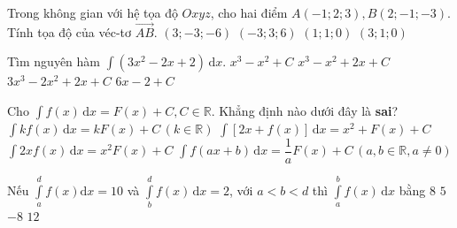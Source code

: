 	\begin{ex}%
		Trong không gian với hệ tọa độ $Oxyz$, cho hai điểm $A(-1;2;3), B(2;-1;-3)$. Tính tọa độ của véc-tơ $\overrightarrow{AB}$.		
		\choice
		{$(3;-3;-6)$}
		{$(-3;3;6)$}
		{$(1;1;0)$}
		{$(3;1;0)$}
	\end{ex}
	\begin{ex}%
		Tìm nguyên hàm  $\displaystyle\int (3x^2-2x+2)\mathrm{\,d}x$.
		\choice
		{$x^3-x^2+C$}
		{\True $x^3-x^2+2x+C$}
		{$3x^3-2x^2+2x+C$}
		{$6x-2+C$}
	\end{ex}
	\begin{ex}%
		Cho $\displaystyle\int f(x)\mathrm{\,d}x=F(x)+C, C\in \mathbb{R}$. Khẳng định nào dưới đây là \textbf{sai}?		
		\choice
		{$\displaystyle\int kf(x)\mathrm{\,d}x=kF(x)+C\, (k \in \mathbb{R})$}
		{$\displaystyle\int [2x+f(x)]\mathrm{\,d}x=x^2+F(x)+C$}
		{\True $\displaystyle\int 2xf(x)\mathrm{\,d}x=x^2F(x)+C$}
		{$\displaystyle\int f(ax+b)\mathrm{\,d}x=\dfrac{1}{a}F(x)+C\, (a,b \in \mathbb{R}, a\ne 0)$}
	\end{ex}
	\begin{ex}%
		Nếu $\displaystyle\int\limits_{a}^{d} f(x)\mathrm{d}x=10$ và $\displaystyle\int\limits_{b}^{d} f(x)\mathrm{\,d}x=2$, với $a<b<d$
		thì $\displaystyle\int\limits_{a}^{b} f(x)\mathrm{\,d}x$ bằng
		\choice
		{\True $8$}
		{$5$}
		{$-8$}
		{$12$}
	\end{ex}
